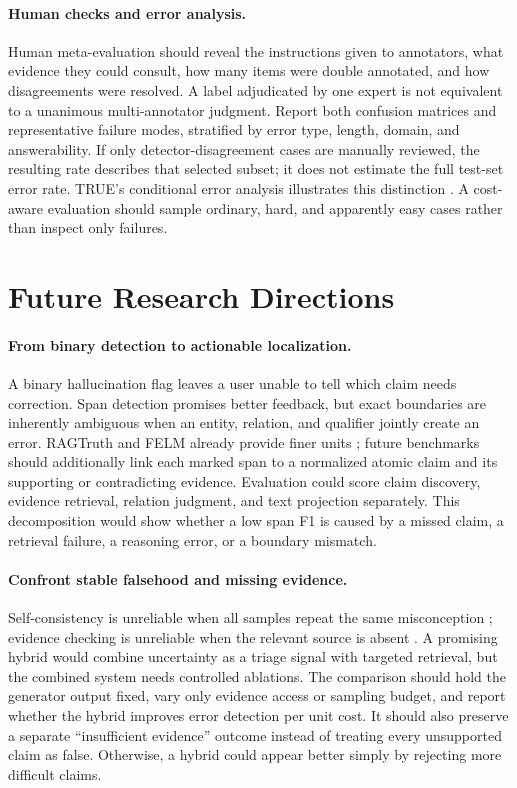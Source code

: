 \documentclass[11pt]{article}
\begin{document}
\paragraph{Human checks and error analysis.} Human meta-evaluation should reveal the instructions given to annotators, what evidence they could consult, how many items were double annotated, and how disagreements were resolved. A label adjudicated by one expert is not equivalent to a unanimous multi-annotator judgment. Report both confusion matrices and representative failure modes, stratified by error type, length, domain, and answerability. If only detector-disagreement cases are manually reviewed, the resulting rate describes that selected subset; it does not estimate the full test-set error rate. TRUE's conditional error analysis illustrates this distinction \citep{C11}. A cost-aware evaluation should sample ordinary, hard, and apparently easy cases rather than inspect only failures.

\section{Future Research Directions}
\paragraph{From binary detection to actionable localization.} A binary hallucination flag leaves a user unable to tell which claim needs correction. Span detection promises better feedback, but exact boundaries are inherently ambiguous when an entity, relation, and qualifier jointly create an error. RAGTruth and FELM already provide finer units \citep{C12,C13}; future benchmarks should additionally link each marked span to a normalized atomic claim and its supporting or contradicting evidence. Evaluation could score claim discovery, evidence retrieval, relation judgment, and text projection separately. This decomposition would show whether a low span F1 is caused by a missed claim, a retrieval failure, a reasoning error, or a boundary mismatch.

\paragraph{Confront stable falsehood and missing evidence.} Self-consistency is unreliable when all samples repeat the same misconception \citep{C08}; evidence checking is unreliable when the relevant source is absent \citep{C07}. A promising hybrid would combine uncertainty as a triage signal with targeted retrieval, but the combined system needs controlled ablations. The comparison should hold the generator output fixed, vary only evidence access or sampling budget, and report whether the hybrid improves error detection per unit cost. It should also preserve a separate ``insufficient evidence'' outcome instead of treating every unsupported claim as false. Otherwise, a hybrid could appear better simply by rejecting more difficult claims.
\end{document}
